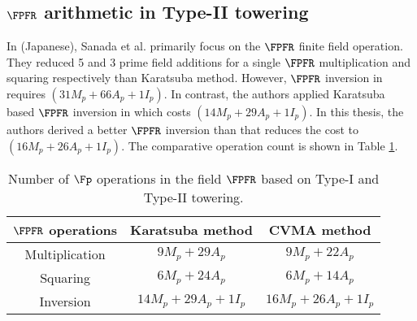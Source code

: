 \subsection{$\FPFR$ arithmetic in Type-II towering}
In \cite{cvma_sanada} (Japanese), Sanada et al. primarily focus on the $\FPFR$ finite field operation.
They reduced 5 and 3 prime field additions for a single $\FPFR$ multiplication and squaring respectively than Karatsuba method.
However, $\FPFR$ inversion in \cite{cvma_sanada} requires $(31 M_p +66A_p+1I_p)$.
In contrast, the authors applied Karatsuba based $\FPFR$ inversion in \cite{INDOCRYPT:KNGDNK17} which costs $(14 M_p +29A_p+1I_p)$.
In this thesis, the authors derived a better $\FPFR$ inversion than \cite{cvma_sanada} that reduces the cost to $(16M_p+26A_p+1I_p)$. 
The comparative operation count is shown in Table \ref{tab_fp4_operation}.
\renewcommand{\baselinestretch}{1.5}
\begin{table*}[!h]
	\centering
	\begin{tabular}{|c|c|c|}
		\hline
		$\FPFR  $ operations & Karatsuba method               & CVMA  method \\
		\hline
		Multiplication    & $9M_p + 29A_p$     & $9M_p+22A_p$       \\ \hline
		Squaring          & $6M_p+24A_p$       & $6M_p+14A_p$       \\ \hline
		Inversion         & $14M_p+29A_p+1I_p$ & $16M_p+26A_p+1I_p$ \\ \hline
	\end{tabular}
	\caption{Number of $\Fp$ operations in the field $\FPFR$ based on Type-I and Type-II towering.}
	\label{tab_fp4_operation}
\end{table*}
\renewcommand{\baselinestretch}{1.0}
